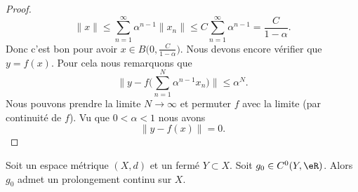 \begin{proof}
		\begin{equation}
			\| x \|\leq\sum_{n=1}^{\infty}\alpha^{n-1}\| x_n \|\leq C\sum_{n=1}^{\infty}\alpha^{n-1}=\frac{ C }{ 1-\alpha }.
		\end{equation}
		Donc c'est bon pour avoir \( x\in B\big( 0,\frac{ C }{ 1-\alpha } \big)\). Nous devons encore vérifier que \( y=f(x)\). Pour cela nous remarquons que
		\begin{equation}
			\| y-f\Big( \sum_{n=1}^N\alpha^{n-1}x_n \Big) \|\leq \alpha^N.
		\end{equation}
		Nous pouvons prendre la limite \( N\to \infty\) et permuter \( f\) avec la limite (par continuité de \( f\)). Vu que \( 0<\alpha<1\) nous avons
		\begin{equation}
			\| y-f(x) \|=0.
		\end{equation}
	\end{proof}

	\begin{theorem}   \label{ThoFFQooGvcLzJ}
		Soit un espace métrique \( (X,d)\) et un fermé \( Y\subset X\). Soit \( g_0\in C^0(Y,\eR)\). Alors \( g_0\) admet un prolongement continu sur \( X\).
	\end{theorem}

